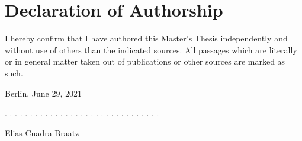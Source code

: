 \documentclass[a4paper,11pt]{article}
\newcommand{\thesistype}{Master's Thesis}
\newcommand{\thesisauthor}{Elias Cuadra Braatz}
\newcommand{\thesisdate}{June 29, 2021}
\begin{document}




\newpage
\thispagestyle{empty}
\hypertarget{declaration-of-authorship}{%
\section*{Declaration of Authorship}\label{declaration-of-authorship}}

I hereby confirm that I have authored this \thesistype{} independently and
without use of others than the indicated sources. All passages which are
literally or in general matter taken out of publications or other sources are
marked as such.
\vspace{1cm}

Berlin, \thesisdate{}
\vspace{3cm}

. . . . . . . . . . . . . . . . . . . . . . . . . . . . . . .
\vspace{0.1cm}

\thesisauthor{}
\end{document}
